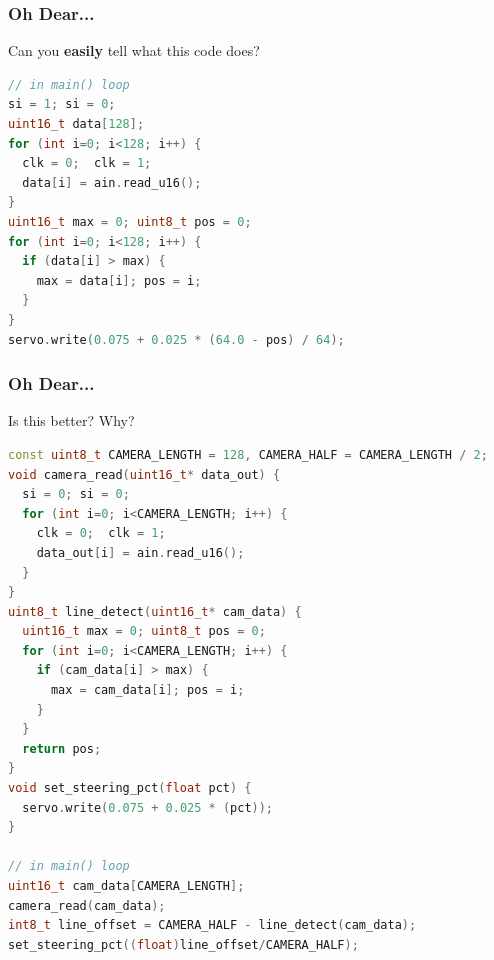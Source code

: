 \documentclass{beamer}
\begin{document}
\begin{frame}[fragile]
\frametitle{Oh Dear...}
Can you \textbf{easily} tell what this code does?
\vspace{2px}
\begin{lstlisting}[language=C++,basicstyle=\ttfamily\tiny]
// in main() loop
si = 1; si = 0;
uint16_t data[128];
for (int i=0; i<128; i++) {
  clk = 0;  clk = 1;
  data[i] = ain.read_u16();
}
uint16_t max = 0; uint8_t pos = 0;
for (int i=0; i<128; i++) {
  if (data[i] > max) {
    max = data[i]; pos = i;
  }
}
servo.write(0.075 + 0.025 * (64.0 - pos) / 64);
\end{lstlisting}
\vspace{2px}
\end{frame}

\begin{frame}[fragile]
\frametitle{Oh Dear...}
Is this better? Why?
\vspace{2px}
\begin{lstlisting}[language=C++,basicstyle=\ttfamily\tiny]
const uint8_t CAMERA_LENGTH = 128, CAMERA_HALF = CAMERA_LENGTH / 2;
void camera_read(uint16_t* data_out) {
  si = 0; si = 0;
  for (int i=0; i<CAMERA_LENGTH; i++) {
    clk = 0;  clk = 1;
    data_out[i] = ain.read_u16();
  }
}
uint8_t line_detect(uint16_t* cam_data) {
  uint16_t max = 0; uint8_t pos = 0;
  for (int i=0; i<CAMERA_LENGTH; i++) {
    if (cam_data[i] > max) {
      max = cam_data[i]; pos = i;
    }
  }
  return pos;
}
void set_steering_pct(float pct) {
  servo.write(0.075 + 0.025 * (pct));
}

// in main() loop
uint16_t cam_data[CAMERA_LENGTH];
camera_read(cam_data);
int8_t line_offset = CAMERA_HALF - line_detect(cam_data);
set_steering_pct((float)line_offset/CAMERA_HALF);
\end{lstlisting}
\end{frame}
\end{document}
